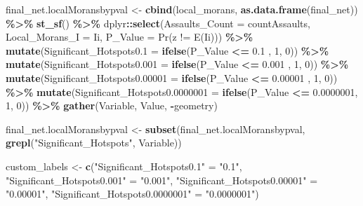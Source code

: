 \documentclass[
]{article}
\newenvironment{Shaded}{\begin{snugshade}}{\end{snugshade}}
\newcommand{\AttributeTok}[1]{\textcolor[rgb]{0.13,0.29,0.53}{#1}}
\newcommand{\DecValTok}[1]{\textcolor[rgb]{0.00,0.00,0.81}{#1}}
\newcommand{\FloatTok}[1]{\textcolor[rgb]{0.00,0.00,0.81}{#1}}
\newcommand{\FunctionTok}[1]{\textcolor[rgb]{0.13,0.29,0.53}{\textbf{#1}}}
\newcommand{\NormalTok}[1]{#1}
\newcommand{\OtherTok}[1]{\textcolor[rgb]{0.56,0.35,0.01}{#1}}
\newcommand{\SpecialCharTok}[1]{\textcolor[rgb]{0.81,0.36,0.00}{\textbf{#1}}}
\newcommand{\StringTok}[1]{\textcolor[rgb]{0.31,0.60,0.02}{#1}}
\begin{document}
\begin{Shaded}
\begin{Highlighting}[]
\NormalTok{final\_net.localMoransbypval }\OtherTok{\textless{}{-}} 
  \FunctionTok{cbind}\NormalTok{(local\_morans, }\FunctionTok{as.data.frame}\NormalTok{(final\_net)) }\SpecialCharTok{\%\textgreater{}\%} 
  \FunctionTok{st\_sf}\NormalTok{() }\SpecialCharTok{\%\textgreater{}\%}
\NormalTok{  dplyr}\SpecialCharTok{::}\FunctionTok{select}\NormalTok{(}\AttributeTok{Assaults\_Count =}\NormalTok{ countAssaults, }
                \AttributeTok{Local\_Morans\_I =}\NormalTok{ Ii, }
                \AttributeTok{P\_Value =} \StringTok{\textasciigrave{}}\AttributeTok{Pr(z != E(Ii))}\StringTok{\textasciigrave{}}\NormalTok{) }\SpecialCharTok{\%\textgreater{}\%}
  \FunctionTok{mutate}\NormalTok{(}\AttributeTok{Significant\_Hotspots0.1 =} \FunctionTok{ifelse}\NormalTok{(P\_Value }\SpecialCharTok{\textless{}=} \FloatTok{0.1}\NormalTok{ , }\DecValTok{1}\NormalTok{, }\DecValTok{0}\NormalTok{)) }\SpecialCharTok{\%\textgreater{}\%}
  \FunctionTok{mutate}\NormalTok{(}\AttributeTok{Significant\_Hotspots0.001 =} \FunctionTok{ifelse}\NormalTok{(P\_Value }\SpecialCharTok{\textless{}=} \FloatTok{0.001}\NormalTok{ , }\DecValTok{1}\NormalTok{, }\DecValTok{0}\NormalTok{)) }\SpecialCharTok{\%\textgreater{}\%}  
  \FunctionTok{mutate}\NormalTok{(}\AttributeTok{Significant\_Hotspots0.00001 =} \FunctionTok{ifelse}\NormalTok{(P\_Value }\SpecialCharTok{\textless{}=} \FloatTok{0.00001}\NormalTok{ , }\DecValTok{1}\NormalTok{, }\DecValTok{0}\NormalTok{)) }\SpecialCharTok{\%\textgreater{}\%}  
  \FunctionTok{mutate}\NormalTok{(}\AttributeTok{Significant\_Hotspots0.0000001 =} \FunctionTok{ifelse}\NormalTok{(P\_Value }\SpecialCharTok{\textless{}=} \FloatTok{0.0000001}\NormalTok{, }\DecValTok{1}\NormalTok{, }\DecValTok{0}\NormalTok{)) }\SpecialCharTok{\%\textgreater{}\%}  
  \FunctionTok{gather}\NormalTok{(Variable, Value, }\SpecialCharTok{{-}}\NormalTok{geometry)}

\NormalTok{final\_net.localMoransbypval }\OtherTok{\textless{}{-}} \FunctionTok{subset}\NormalTok{(final\_net.localMoransbypval, }\FunctionTok{grepl}\NormalTok{(}\StringTok{"Significant\_Hotspots"}\NormalTok{, Variable)) }

\NormalTok{custom\_labels }\OtherTok{\textless{}{-}} \FunctionTok{c}\NormalTok{(}\StringTok{"Significant\_Hotspots0.1"} \OtherTok{=} \StringTok{"0.1"}\NormalTok{, }
                   \StringTok{"Significant\_Hotspots0.001"} \OtherTok{=} \StringTok{"0.001"}\NormalTok{,}
                   \StringTok{"Significant\_Hotspots0.00001"} \OtherTok{=} \StringTok{"0.00001"}\NormalTok{,}
                   \StringTok{"Significant\_Hotspots0.0000001"} \OtherTok{=} \StringTok{"0.0000001"}\NormalTok{)}


\end{Highlighting}
\end{Shaded}
\end{document}
